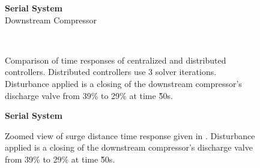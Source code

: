 \begin{figure}
  \ContinuedFloat
  {\centering\large\textbf{Serial System}\\ Downstream Compressor\\[1em]}
  \begin{subfigure}{0.48\linewidth}
    \centering
    \footnotesize
    
    \normalsize
    \caption{}
    \label{fig:res:serial-timeresp:p2}
  \end{subfigure}
  \hfill
  \begin{subfigure}{0.48\linewidth}
    \centering
    \footnotesize
    
    \normalsize
    \caption{}
    \label{fig:res:serial-timeresp:sd2}
  \end{subfigure}
  \\
  \begin{subfigure}{0.48\linewidth}
    \centering
    \footnotesize
    
    \normalsize
    \caption{}
    \label{fig:res:serial-timeresp:td2}
  \end{subfigure}
  \hfill
  \begin{subfigure}{0.48\linewidth}
    \centering
    \footnotesize
    
    \normalsize
    \caption{}
    \label{fig:res:serial-timeresp:ur2}
  \end{subfigure}

  \caption[Time response of serial system.]{Comparison of time responses of centralized and distributed controllers. Distributed controllers use 3 solver iterations. Disturbance applied is a closing of the downstream compressor's discharge valve from 39\% to 29\% at time \u{50}{s}.}
  \label{fig:res:serial-timeresp}
\end{figure}

\begin{figure}
  {\centering\large\textbf{Serial System}\\[1em]}
  \begin{subfigure}{0.48\linewidth}
    \footnotesize
    
    \normalsize
  \end{subfigure}
  \hfill
  \begin{subfigure}{0.48\linewidth}
    \footnotesize
    
    \normalsize
  \end{subfigure}
  \caption[Zoom of surge distance time response.]{Zoomed view of surge distance time response given in . 
  Disturbance applied is a closing of the downstream compressor's discharge valve from 39\% to 29\% at time \u{50}{s}.}
  \label{fig:res:serial-sd-zoom}
\end{figure}
\fi


